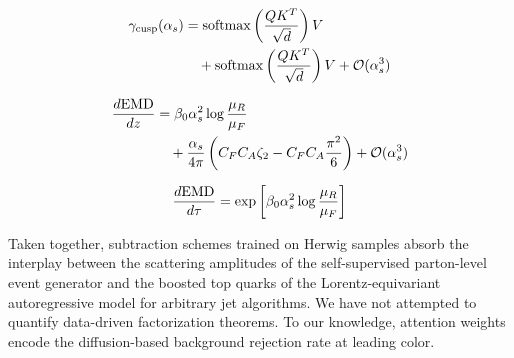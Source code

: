 \begin{align}
  \gamma_{\rm cusp}(\alpha_s) &= \mathrm{softmax}\left(\frac{Q K^T}{\sqrt{d}}\right) V \nonumber \\
  &\quad + \mathrm{softmax}\left(\frac{Q K^T}{\sqrt{d}}\right) V + \mathcal{O}(\alpha_s^3) \label{eq:3}
\end{align}

\begin{align}
  \frac{d \mathrm{EMD}}{d z} &= \beta_0 \alpha_s^2 \log\frac{\mu_R}{\mu_F} \nonumber \\
  &\quad + \frac{\alpha_s}{4\pi} \left( C_F C_A \zeta_{2} - C_F C_A \frac{\pi^2}{6} \right) + \mathcal{O}(\alpha_s^3) \label{eq:4}
\end{align}

\begin{equation}
  \frac{d \mathrm{EMD}}{d \tau} = \exp\left[\beta_0 \alpha_s^2 \log\frac{\mu_R}{\mu_F}\right]
  \label{eq:5}
\end{equation}

Taken together, subtraction schemes trained on Herwig samples absorb the
interplay between the scattering amplitudes of the self-supervised
parton-level event generator and the boosted top quarks of the
Lorentz-equivariant autoregressive model for arbitrary jet algorithms.
We have not attempted to quantify data-driven factorization theorems. To
our knowledge, attention weights encode the diffusion-based background
rejection rate at leading color.

